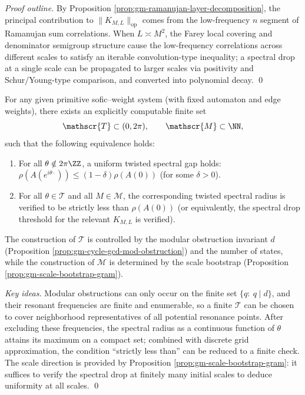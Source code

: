 \begin{proposition}
\begin{proof}[Proof outline]
By Proposition \ref{prop:gm-ramanujan-layer-decomposition}, the principal contribution to \(\|K_{M,L}\|_{\mathrm{op}}\) comes from the low-frequency \(n\) segment of Ramanujan sum correlations.
When \(L\asymp M^2\), the Farey local covering and denominator semigroup structure cause the low-frequency correlations across different scales to satisfy an iterable convolution-type inequality; a spectral drop at a single scale can be propagated to larger scales via positivity and Schur/Young-type comparison, and converted into polynomial decay. \qed
\end{proof}

\begin{theorem}\label{thm:gm-finite-verification-uniform-gap}
For any given primitive sofic--weight system (with fixed automaton and edge weights), there exists an explicitly computable finite set
\[
\mathscr{T}\subset(0,2\pi),\qquad \mathscr{M}\subset\NN,
\]
such that the following equivalence holds:
\begin{enumerate}
  \item For all \(\theta\notin 2\pi\ZZ\), a uniform twisted spectral gap holds: \(\rho(A(e^{i\theta\cdot}))\le (1-\delta)\rho(A(0))\) (for some \(\delta>0\)).
  \item For all \(\theta\in\mathscr{T}\) and all \(M\in\mathscr{M}\), the corresponding twisted spectral radius is verified to be strictly less than \(\rho(A(0))\) (or equivalently, the spectral drop threshold for the relevant \(K_{M,L}\) is verified).
\end{enumerate}
The construction of \(\mathscr{T}\) is controlled by the modular obstruction invariant \(d\) (Proposition \ref{prop:gm-cycle-gcd-mod-obstruction}) and the number of states, while the construction of \(\mathscr{M}\) is determined by the scale bootstrap (Proposition \ref{prop:gm-scale-bootstrap-gram}).
\end{theorem}

\begin{proof}[Key ideas]
Modular obstructions can only occur on the finite set \(\{q:\ q\mid d\}\), and their resonant frequencies are finite and enumerable, so a finite \(\mathscr{T}\) can be chosen to cover neighborhood representatives of all potential resonance points.
After excluding these frequencies, the spectral radius as a continuous function of \(\theta\) attains its maximum on a compact set; combined with discrete grid approximation, the condition ``strictly less than'' can be reduced to a finite check.
The scale direction is provided by Proposition \ref{prop:gm-scale-bootstrap-gram}: it suffices to verify the spectral drop at finitely many initial scales to deduce uniformity at all scales. \qed
\end{proof}


\end{proposition}
